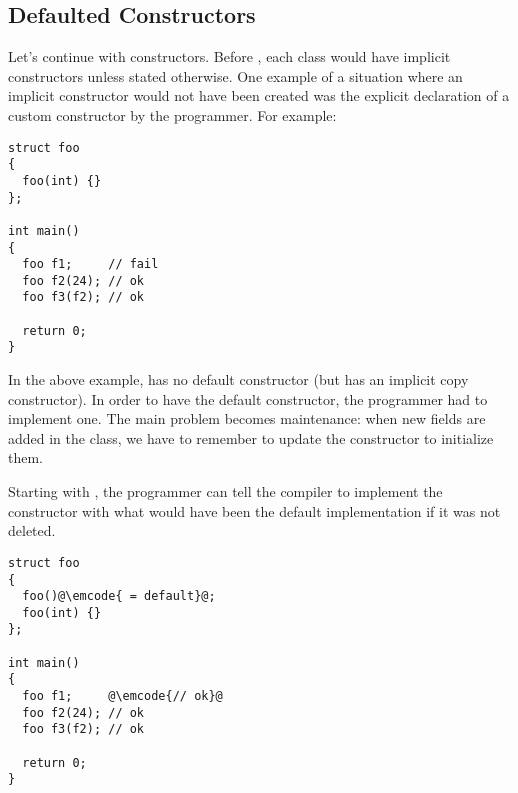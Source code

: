 \subsection{Defaulted Constructors}

\problemtitle

Let's continue with constructors. Before , each class would have
implicit constructors unless stated otherwise. One example of a
situation where an implicit constructor would not have been created
was the explicit declaration of a custom constructor by the
programmer. For example:

\begin{lstlisting}
struct foo
{
  foo(int) {}
};

int main()
{
  foo f1;     // fail
  foo f2(24); // ok
  foo f3(f2); // ok

  return 0;
}
\end{lstlisting}

In the above example,  has no default constructor (but has
an implicit copy constructor). In order to have the default
constructor, the programmer had to implement one. The main problem
becomes maintenance: when new fields are added in the class, we have
to remember to update the constructor to initialize them.

\solutiontitle

Starting with , the programmer can tell the compiler to
implement the constructor with what would have been the default
implementation if it was not deleted.

\begin{lstlisting}
struct foo
{
  foo()@\emcode{ = default}@;
  foo(int) {}
};

int main()
{
  foo f1;     @\emcode{// ok}@
  foo f2(24); // ok
  foo f3(f2); // ok

  return 0;
}
\end{lstlisting}
